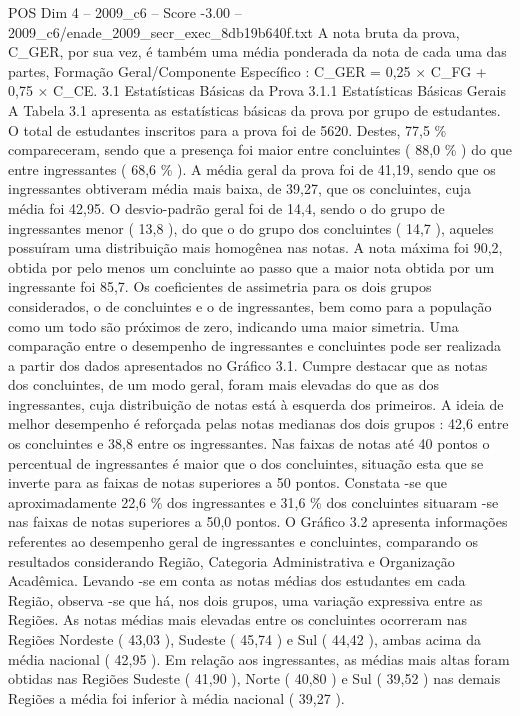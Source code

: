 \begin{textsample}{POS Dim 4 – 2009\_c6 – Score -3.00 – 2009\_c6/enade\_2009\_secr\_exec\_8db19b640f.txt}
A nota bruta da prova, C\_GER, por sua vez, é também uma média ponderada da nota de cada uma das partes, Formação Geral/Componente Específico : C\_GER = 0,25 × C\_FG + 0,75 × C\_CE. 3.1 Estatísticas Básicas da Prova 3.1.1 Estatísticas Básicas Gerais A Tabela 3.1 apresenta as estatísticas básicas da prova por grupo de estudantes.
O total de estudantes inscritos para a prova foi de 5620.
Destes, 77,5 \% compareceram, sendo que a presença foi maior entre concluintes ( 88,0 \% ) do que entre ingressantes ( 68,6 \% ).
A média geral da prova foi de 41,19, sendo que os ingressantes obtiveram média mais baixa, de 39,27, que os concluintes, cuja média foi 42,95.
O desvio-padrão geral foi de 14,4, sendo o do grupo de ingressantes menor ( 13,8 ), do que o do grupo dos concluintes ( 14,7 ), aqueles possuíram uma distribuição mais homogênea nas notas.
A nota máxima foi 90,2, obtida por pelo menos um concluinte ao passo que a maior nota obtida por um ingressante foi 85,7.
Os coeficientes de assimetria para os dois grupos considerados, o de concluintes e o de ingressantes, bem como para a população como um todo são próximos de zero, indicando uma maior simetria.
Uma comparação entre o desempenho de ingressantes e concluintes pode ser realizada a partir dos dados apresentados no Gráfico 3.1.
Cumpre destacar que as notas dos concluintes, de um modo geral, foram mais elevadas do que as dos ingressantes, cuja distribuição de notas está à esquerda dos primeiros.
A ideia de melhor desempenho é reforçada pelas notas medianas dos dois grupos : 42,6 entre os concluintes e 38,8 entre os ingressantes.
Nas faixas de notas até 40 pontos o percentual de ingressantes é maior que o dos concluintes, situação esta que se inverte para as faixas de notas superiores a 50 pontos.
Constata -se que aproximadamente 22,6 \% dos ingressantes e 31,6 \% dos concluintes situaram -se nas faixas de notas superiores a 50,0 pontos.
O Gráfico 3.2 apresenta informações referentes ao desempenho geral de ingressantes e concluintes, comparando os resultados considerando Região, Categoria Administrativa e Organização Acadêmica.
Levando -se em conta as notas médias dos estudantes em cada Região, observa -se que há, nos dois grupos, uma variação expressiva entre as Regiões.
As notas médias mais elevadas entre os concluintes ocorreram nas Regiões Nordeste ( 43,03 ), Sudeste ( 45,74 ) e Sul ( 44,42 ), ambas acima da média nacional ( 42,95 ).
Em relação aos ingressantes, as médias mais altas foram obtidas nas Regiões Sudeste ( 41,90 ), Norte ( 40,80 ) e Sul ( 39,52 ) nas demais Regiões a média foi inferior à média nacional ( 39,27 ).

\end{textsample}
